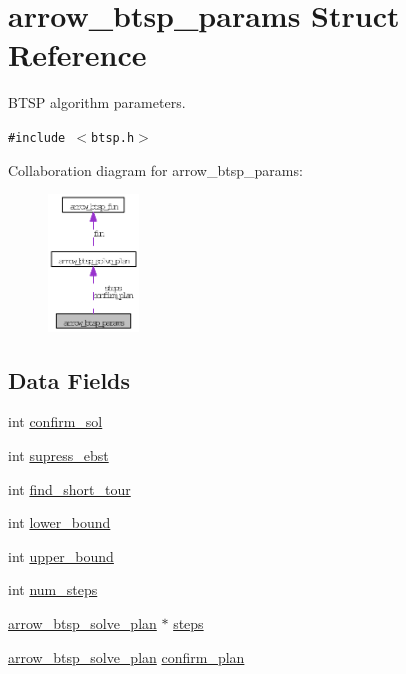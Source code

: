 \hypertarget{structarrow__btsp__params}{
\section{arrow\_\-btsp\_\-params Struct Reference}
\label{structarrow__btsp__params}
}
BTSP algorithm parameters.  


{\tt \#include $<$btsp.h$>$}

Collaboration diagram for arrow\_\-btsp\_\-params:\nopagebreak
\begin{figure}[H]
\begin{center}
\leavevmode
\includegraphics[width=68pt]{structarrow__btsp__params__coll__graph}
\end{center}
\end{figure}
\subsection*{Data Fields}
\begin{CompactItemize}
\item 
int \hyperlink{structarrow__btsp__params_2c579feb3ff41f4d73b5de97596fe465}{confirm\_\-sol}
\item 
int \hyperlink{structarrow__btsp__params_cd85b850ac7c8495a4689100e8c3182c}{supress\_\-ebst}
\item 
int \hyperlink{structarrow__btsp__params_f5fd677200b64930838c6905cbada990}{find\_\-short\_\-tour}
\item 
int \hyperlink{structarrow__btsp__params_da747e3797f9327834e4dbb1459d2786}{lower\_\-bound}
\item 
int \hyperlink{structarrow__btsp__params_b8749004215015a78139b8e4e1fb8905}{upper\_\-bound}
\item 
int \hyperlink{structarrow__btsp__params_2897d24f2fdd53c723609cf68880f55e}{num\_\-steps}
\item 
\hyperlink{structarrow__btsp__solve__plan}{arrow\_\-btsp\_\-solve\_\-plan} $\ast$ \hyperlink{structarrow__btsp__params_49aedb95b2fc4a725e3bb8485470484b}{steps}
\item 
\hyperlink{structarrow__btsp__solve__plan}{arrow\_\-btsp\_\-solve\_\-plan} \hyperlink{structarrow__btsp__params_f6a3bf7e56264d14b9dceb4ce779363c}{confirm\_\-plan}
\end{CompactItemize}


